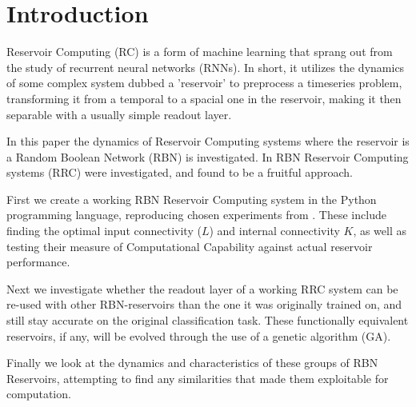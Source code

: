 \section{Introduction}

Reservoir Computing (RC) is a form of machine learning that sprang out from the study of recurrent neural networks (RNNs).
In short, it utilizes the dynamics of some complex system dubbed a 'reservoir' to preprocess a timeseries problem,
transforming it from a temporal to a spacial one in the reservoir, making it then separable with a usually simple readout layer.

In this paper the dynamics of Reservoir Computing systems where the reservoir is a Random Boolean Network (RBN) \cite{gershenson2004introduction} is investigated.
In \cite{rbn-reservoir} RBN Reservoir Computing systems (RRC) were investigated,
and found to be a fruitful approach.

First we create a working RBN Reservoir Computing system in the Python programming language,
reproducing chosen experiments from \cite{rbn-reservoir}.
These include finding the optimal input connectivity ($L$) and internal connectivity $K$,
as well as testing their measure of Computational Capability against actual reservoir performance.

Next we investigate whether the readout layer of a working RRC system can be re-used with other RBN-reservoirs than the one it was originally trained on,
and still stay accurate on the original classification task.
These functionally equivalent reservoirs, if any, will be evolved through the use of a genetic algorithm (GA).

Finally we look at the dynamics and characteristics of these groups of RBN Reservoirs,
attempting to find any similarities that made them exploitable for computation.
